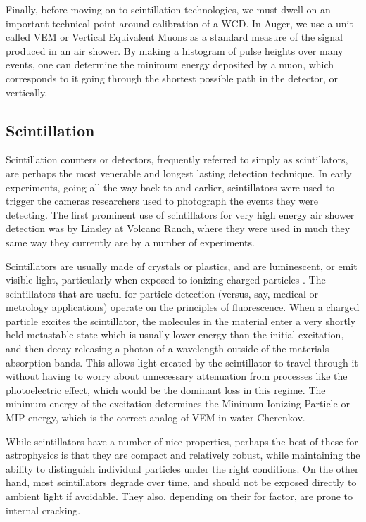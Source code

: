 Finally, before moving on to scintillation technologies, we must dwell on an important technical point around calibration of a WCD. In Auger, we use a unit called VEM or Vertical Equivalent Muons as a standard measure of the signal produced in an air shower. By making a histogram of pulse heights over many events, one can determine the minimum energy deposited by a muon, which corresponds to it going through the shortest possible path in the detector, or vertically. 
\subsection{Scintillation}
\label{scints}
Scintillation counters or detectors, frequently referred to simply as scintillators, are perhaps the most venerable and longest lasting detection technique. In early experiments, going all the way back to \textcite{muon} and earlier, scintillators were used to trigger the cameras researchers used to photograph the events they were detecting. The first prominent use of scintillators for very high energy air shower detection was by Linsley at Volcano Ranch, where they were used in much they same way they currently are by a number of experiments. 

Scintillators are usually made of crystals or plastics, and are luminescent, or emit visible light, particularly when exposed to ionizing charged particles \cite{scints}. The scintillators that are useful for particle detection (versus, say, medical or metrology applications) operate on the principles of fluorescence. When a charged particle excites the scintillator, the molecules in the material enter a very shortly held metastable state which is usually lower energy than the initial excitation, and then decay releasing a photon of a wavelength outside of the materials absorption bands. This allows light created by the scintillator to travel through it without having to worry about unnecessary attenuation from processes like the photoelectric effect, which would be the dominant loss in this regime. The minimum energy of the excitation determines the Minimum Ionizing Particle or MIP energy, which is the correct analog of VEM in water Cherenkov.

While scintillators have a number of nice properties, perhaps the best of these for astrophysics is that they are compact and relatively robust, while maintaining the ability to distinguish individual particles under the right conditions. On the other hand, most scintillators degrade over time, and should not be exposed directly to ambient light if avoidable. They also, depending on their for factor, are prone to internal cracking.

